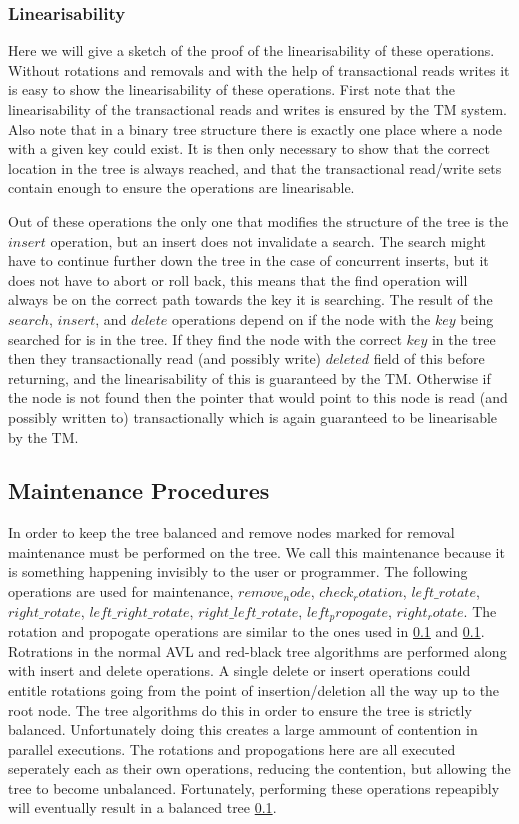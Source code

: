 \documentclass[10pt]{sigplanconf}
\begin{document}
\subsubsection{Linearisability}
Here we will give a sketch of the proof of the linearisability of these operations.
Without rotations and removals and with the help of transactional reads writes it is easy to show the linearisability of these operations.
First note that the linearisability of the transactional reads and writes is ensured by the TM system.
Also note that in a binary tree structure there is exactly one place where a node with a given key could exist.
It is then only necessary to show that the correct location in the tree is always reached, and that the transactional read/write sets contain enough to ensure the operations are linearisable.

Out of these operations the only one that modifies the structure of the tree is the $insert$ operation, but an insert does not invalidate a search.
The search might have to continue further down the tree in the case of concurrent inserts, but it does not have to abort or roll back, this means that the find operation will always be on the correct path towards the key it is searching.
The result of the $search$, $insert$, and $delete$ operations depend on if the node with the $key$ being searched for is in the tree.
If they find the node with the correct $key$ in the tree then they transactionally read (and possibly write) $deleted$ field of this before returning, and the linearisability of this is guaranteed by the TM.
Otherwise if the node is not found then the pointer that would point to this node is read (and possibly written to) transactionally which is again guaranteed to be linearisable by the TM.

\subsection{Maintenance Procedures}
In order to keep the tree balanced and remove nodes marked for removal maintenance must be performed on the tree.
We call this maintenance because it is something happening invisibly to the user or programmer.
The following operations are used for maintenance, $remove_node$, $check_rotation$, $left\_rotate$, $right\_rotate$, $left\_right\_rotate$, $right\_left\_rotate$, $left_propogate$, $right_rotate$.
The rotation and propogate operations are similar to the ones used in \ref{} and \ref{}.
Rotrations in the normal AVL and red-black tree algorithms are performed along with insert and delete operations.
A single delete or insert operations could entitle rotations going from the point of insertion/deletion all the way up to the root node.
The tree algorithms do this in order to ensure the tree is strictly balanced.
Unfortunately doing this creates a large ammount of contention in parallel executions.
The rotations and propogations here are all executed seperately each as their own operations, reducing the contention, but allowing the tree to become unbalanced.
Fortunately, performing these operations repeapibly will eventually result in a balanced tree \ref{}.
\end{document}
